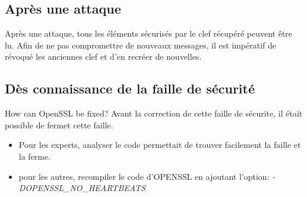 \documentclass[a4paper,oneside,1pt]{article}
\begin{document}
\subsection{Après une attaque}

Après une attaque, tous les éléments sécurisés par le clef récupéré peuvent être lu. Afin de ne pas compromettre de nouveaux messages, il est impératif de révoqué les anciennes clef et d'en recréer de nouvelles. 

\subsection{Dès connaissance de la faille de sécurité}
How can OpenSSL be fixed?
Avant la correction de cette faille de sécurite, il était possible de fermet cette faille. 
\begin{itemize}
	\item Pour les experts, analyser le code permettait de trouver facilement la faille et la ferme. 
	\item pour les autres, recompiler le code d'OPENSSL en ajoutant l'option: \textit{-DOPENSSL\_NO\_HEARTBEATS}
\end{itemize}







\end{document}
